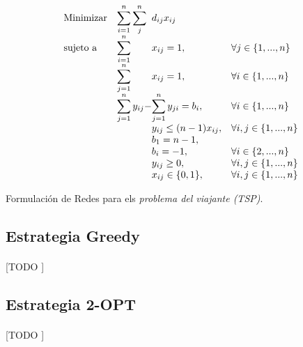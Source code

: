 \documentclass[spanish]{article}
\begin{document}
				\begin{eqfloat}
					\begin{equation}
						\begin{array}{ll@{}ll}
							\text{Minimizar}	& \displaystyle\sum\limits_{i = 1}^{n}\sum\limits_{j}^{n} & d_{ij}x_{ij} &\\
							\text{sujeto a}		& \displaystyle\sum\limits_{i = 1}^{n}	&	x_{ij} 	= 1,  & \forall j \in \{1,...,n\}\\
																& \displaystyle\sum\limits_{j = 1}^{n}	&	x_{ij} 	= 1,  & \forall i \in \{1,...,n\}\\
																& \displaystyle\sum\limits_{j = 1}^n	y_{ij} - &\displaystyle\sum\limits_{j = 1}^n	y_{ji} = b_{i},  & \forall i \in \{1,...,n\} \\
																&                               &	y_{ij}  \leq (n-1)x_{ij}, 	&  \forall i,j \in \{1,...,n\}\\
																&                               &	b_{1}  = n - 1, 	& \\
																&                               &	b_{i} = -1, 		& \forall i \in \{2,...,n\} \\
																&                               &	y_{ij} \geq 0, 		& \forall i,j \in \{1,...,n\} \\
																&                               &	x_{ij} \in \{0,1\}, 	& \forall i,j \in \{1,...,n\}
						\end{array}
					\end{equation}
					\caption{Formulación de Redes para els \emph{problema del viajante (TSP)}.}
					\label{eq:tsp_redes}
				\end{eqfloat}


		\subsection{Estrategia Greedy}

			\paragraph{}
			[TODO ]


		\subsection{Estrategia 2-OPT}

			\paragraph{}
			[TODO ]
\end{document}
